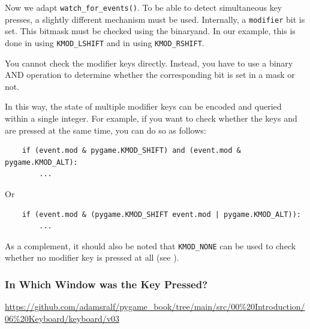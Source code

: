 \newpage
{}

Now we adapt \texttt{watch\_for\_events()}. To be able to detect simultaneous key presses, a slightly different mechanism must be used. Internally, a \texttt{modifier} bit
 is set. This bitmask must be checked using the \gls{binaryand}. In our example, this is done in  using \texttt{KMOD\_LSHIFT} and in  using \texttt{KMOD\_RSHIFT}.


\begin{hintbox}
	You cannot check the modifier keys directly. Instead, you have to use a binary AND operation to determine whether the corresponding bit is set in a mask or not.
\end{hintbox}

In this way, the state of multiple modifier keys can be encoded and queried within a single integer. For example, if you want to check whether the keys \keys{\shift} and \keys{\Alt} are pressed at the same time, you can do so as follows:

\lstset{firstnumber=69}
\begin{lstlisting}
	if (event.mod & pygame.KMOD_SHIFT) and (event.mod & pygame.KMOD_ALT):
		...
\end{lstlisting}

Or

\lstset{firstnumber=69}
\begin{lstlisting}
	if (event.mod & (pygame.KMOD_SHIFT event.mod | pygame.KMOD_ALT)):
	    ...
\end{lstlisting}

As a complement, it should also be noted that \texttt{KMOD\_NONE} can be used to check whether no modifier key is pressed at all (see ).
 

\subsubsection{In Which Window was the Key Pressed?}\label{secMultipleWindowKeyboard}
\begin{diskbox}
	\url{https://github.com/adamsralf/pygame_book/tree/main/src/00%20Introduction/06%20Keyboard/keyboard/v03}
\end{diskbox}

